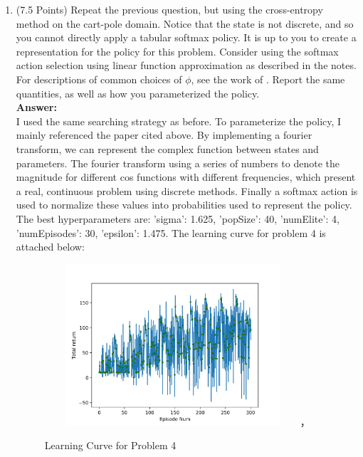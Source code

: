 \documentclass[]{article}
\begin{document}
\begin{enumerate}
    \item (7.5 Points) Repeat the previous question, but using the cross-entropy method on the cart-pole domain. Notice that the state is not discrete, and so you cannot directly apply a tabular softmax policy. It is up to you to create a representation for the policy for this problem. Consider using the softmax action selection using linear function approximation as described in the notes. For descriptions of common choices of $\phi$, see the work of \cite{Konidaris2011}. Report the same quantities, as well as how you parameterized the policy. \\
    \textbf{Answer:}\\
    I used the same searching strategy as before. To parameterize the policy, I mainly referenced the paper cited above. By implementing a fourier transform, we can represent the complex function between states and parameters. The fourier transform using a series of numbers to denote the magnitude for different cos functions with different frequencies, which present a real, continuous problem using discrete methods. Finally a softmax action is used to normalize these values into probabilities used to represent the policy. The best hyperparameters are: 'sigma': 1.625, 'popSize': 40, 'numElite': 4, 'numEpisodes': 30, 'epsilon': 1.475. The learning curve for problem 4 is attached below:
    \begin{figure}[htbp]
        \centering
        \includegraphics[height=6.0cm,width=9.5cm]{p6.png}，
        \caption{Learning Curve for Problem 4}
    \end{figure}


\end{enumerate}
\end{document}
